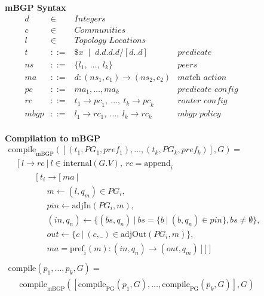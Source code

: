\documentclass[numbers, 10pt]{sigplanconf}
\newcommand{\BNFALT}{\;\;|\;\;}
\newcommand{\hdr}[2]{\flushleft \chdr{\hspace{5mm}#1}{#2}}
\newcommand{\chdr}[2]{\textbf{#1} {#2} \\ \centering}%
\begin{document}
\vspace{2em}
\begin{figure}[t!]\small%
  

  \begin{minipage}[t]{.47\linewidth}
  \hdr{mBGP Syntax}{}
  \vspace*{-1\baselineskip}
  \[ \begin{array}{rclr}
     d    &\in& \textit{Integers} & \\
     c    &\in& \textit{Communities} & \\
     l    &\in& \textit{Topology Locations} & \\
     t    &::=& \$x \BNFALT d.d.d.d/[d..d] & \textit{predicate} \\
     ns   &::=& \{ l_1, ~\dots,~ l_k \} & \textit{peers} \\
     ma   &::=& d : ({ns}_1, c_1) \rightarrow ({ns}_2, c_2) & \textit{match action} \\
     pc   &::=& ma_1, \dots, ma_k & \textit{predicate config} \\
     rc   &::=& t_1 \rightarrow {pc}_1, ~\dots,~ t_k \rightarrow {pc}_k & \textit{router config} \\
     mbgp &::=& l_1 \rightarrow {rc}_1, ~\dots,~ l_k \rightarrow {rc}_k & \textit{mbgp policy} \\%
  \end{array} \]%

  \end{minipage}
  \begin{minipage}[t]{.49\linewidth}
  \hdr{Compilation to mBGP}{}
  \vspace*{-1\baselineskip}
  \[ \begin{array}{l}
     \mathrm{compile}_\mathrm{mBGP}( [(t_1,PG_1,pref_1), \dots, (t_k,PG_k,pref_k)], G ) = \\
     ~~~~~ [~ l \rightarrow rc ~\vert~ l \in \mathrm{internal}(G.V), ~rc = \mathrm{append}_i~  \\
     ~~~~~~~~~~~~~~~ [~ t_i \rightarrow [~ ma ~\vert~ \\
     ~~~~~~~~~~~~~~~~~~~~~ m \leftarrow (l,q_m) \in PG_i, \\
     ~~~~~~~~~~~~~~~~~~~~~ pin \leftarrow \mathrm{adjIn}(PG_i,m), \\
     ~~~~~~~~~~~~~~~~~~~~~ (in,q_n) \leftarrow \{ (bs,q_n) ~\vert~ bs=\{b ~\vert~ (b,q_n) \in pin \}, bs \neq \emptyset \}, \\
     ~~~~~~~~~~~~~~~~~~~~~ out \leftarrow \{ c ~\vert~ (c,\_) \in \mathrm{adjOut}(PG_i,m) \}, \\
     ~~~~~~~~~~~~~~~~~~~~~ ma = \mathrm{pref}_i(m) : (in,q_n) \rightarrow (out,q_m) ~] ~] ~] \\
     \\
     \mathrm{compile}( p_1, \dots, p_k, G) = \\
     ~~~~~~ \mathrm{compile}_\mathrm{mBGP}([\mathrm{compile}_\mathrm{PG}(p_1,G), \dots, \mathrm{compile}_\mathrm{PG}(p_k,G)], G) \\
  \end{array} \]%
  \end{minipage}%


\end{figure}
\end{document}
